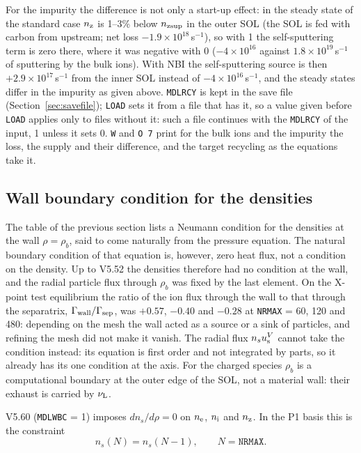 \documentclass[11pt]{article}
\def\r#1{{\rm#1}}
\def\nee{n_\r{e}}
\def\ni{n_\r{i}}
\def\nz{n_\r{z}}
\def\uV#1{u_\r{#1}^V}
\def\nsup#1{n_\r{#1sup}}
\def\nuL{\nu_\r{L}}
\begin{document}
For the impurity the difference is not only a start-up effect: in the steady state
of the standard case $\nz$ is 1--3\% below $\nsup{z}$ in the outer SOL (the SOL is
fed with carbon from upstream; net loss $-1.9\times10^{18}$\,s$^{-1}$), so with 1 the
self-sputtering term is zero there, where it was negative with 0
($-4\times10^{16}$ against $1.8\times10^{19}$\,s$^{-1}$ of sputtering by the bulk ions).
With NBI the self-sputtering source is then $+2.9\times10^{17}$\,s$^{-1}$ from the inner SOL
instead of $-4\times10^{16}$\,s$^{-1}$, and the steady states differ in the impurity as given above.
\texttt{MDLRCY} is kept in the save file (Section~\ref{sec:savefile}); \texttt{LOAD} sets it
from a file that has it, so a value given before \texttt{LOAD} applies only
to files without it: such a file continues with the
\texttt{MDLRCY} of the input, 1 unless it sets 0.  \texttt{W} and \texttt{O 7} print for the bulk ions and the impurity
the loss, the supply and their difference, and the target recycling as the equations
take it.

\subsection{Wall boundary condition for the densities}
\label{sec:wallbc}

The table of the previous section lists a Neumann condition for the densities
at the wall $\rho=\rho_b$, said to come naturally from the pressure equation.
The natural boundary condition of that equation is, however, zero heat flux, not
a condition on the density.  Up to V5.52 the densities therefore had no
condition at the wall, and the radial particle flux through $\rho_b$ was fixed by
the last element.  On the X-point test equilibrium the ratio of the ion flux
through the wall to that through the separatrix,
$\Gamma_\r{wall}/\Gamma_\r{sep}$, was $+0.57$, $-0.40$ and $-0.28$ at
\texttt{NRMAX} = 60, 120 and 480: depending on the mesh the wall acted as a
source or a sink of particles, and refining the mesh did not make it vanish.  The radial flux
$n_s\uV{s}$ cannot take the condition instead: its equation is first order and
not integrated by parts, so it already has its one condition at the axis.
For the charged species $\rho_b$ is a computational boundary at the outer edge of
the SOL, not a material wall: their exhaust is carried by $\nuL$.

V5.60 (\texttt{MDLWBC} = 1) imposes $dn_s/d\rho = 0$ on $\nee$, $\ni$ and $\nz$.
In the P1 basis this is the constraint
\begin{equation}
  n_s(N) = n_s(N-1),\qquad N = \texttt{NRMAX}.
\end{equation}
\end{document}
